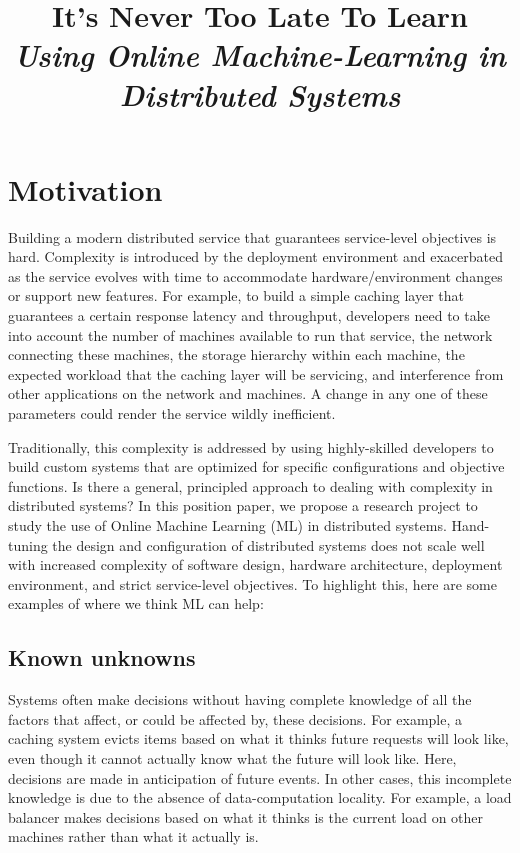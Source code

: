 \documentclass[a4paper,twocolumn]{article}
\title{
  It's Never Too Late To Learn\\
  \emph{Using Online Machine-Learning in Distributed Systems}
}
\author{}
\date{}
\begin{document}
\maketitle

\section{Motivation}

Building a modern distributed service that guarantees service-level objectives
is hard. Complexity is introduced by the deployment environment and exacerbated
as the service evolves with time to accommodate hardware/environment changes or
support new features.
For example, to build a simple caching layer that guarantees a certain response
latency and throughput, developers need to take into account the number of
machines available to run that service, the network connecting these machines,
the storage hierarchy within each machine, the expected workload that the
caching layer will be servicing, and interference from other applications on the
network and machines.  A change in any one of these parameters could render the
service wildly inefficient.

Traditionally, this complexity is addressed by using highly-skilled developers
to build custom systems that are optimized for specific configurations and
objective functions.  Is there a general, principled approach to dealing with
complexity in distributed systems?
In this position paper, we propose a research project to study the use of Online
Machine Learning (ML) in distributed systems.  Hand-tuning the design and
configuration of distributed systems does not scale well with increased
complexity of software design, hardware architecture, deployment environment,
and strict service-level objectives.
To highlight this, here are some examples of where we think ML can help:

\subsection*{Known unknowns}
Systems often make decisions without having complete knowledge of all the
factors that affect, or could be affected by, these decisions.  For example, a
caching system evicts items based on what it thinks future requests will look
like, even though it cannot actually know what the future will look like. Here,
decisions are made in anticipation of future events.  In other cases, this
incomplete knowledge is due to the absence of data-computation locality. For
example, a load balancer makes decisions based on what it thinks is the current
load on other machines rather than what it actually is.
\end{document}
